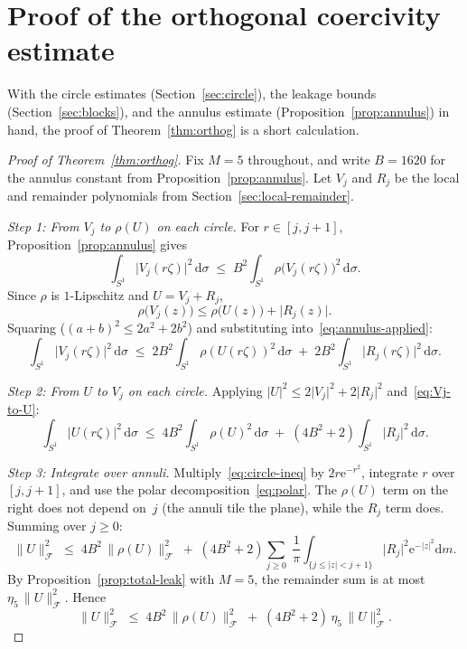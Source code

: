 \documentclass[11pt]{amsart}
\theoremstyle{definition}
\theoremstyle{remark}
\begin{document}
 \section{Proof of the orthogonal coercivity estimate}\label{sec:assembly}

With the circle estimates (Section~\ref{sec:circle}), the leakage bounds
(Section~\ref{sec:blocks}), and the annulus estimate
(Proposition~\ref{prop:annulus}) in hand, the proof of
Theorem~\ref{thm:orthog} is a short calculation.

\begin{proof}[Proof of Theorem~\ref{thm:orthog}]
Fix $M = 5$ throughout, and write $B = 1620$ for the annulus constant from
Proposition~\ref{prop:annulus}.  Let $V_j$ and $R_j$ be the local and
remainder polynomials from Section~\ref{sec:local-remainder}.

\medskip
\noindent
\emph{Step 1: From $V_j$ to $\rho(U)$ on each circle.}\;
For $r \in [j, j{+}1]$, Proposition~\ref{prop:annulus} gives
\begin{equation}\label{eq:annulus-applied}
\int_{S^1}\lvert V_j(r\zeta) \rvert^2\,\mathrm{d}\sigma
\;\le\;
B^2\int_{S^1}\rho\bigl(V_j(r\zeta)\bigr)^2\,\mathrm{d}\sigma.
\end{equation}
Since $\rho$ is $1$-Lipschitz and $U = V_j + R_j$,
\[
\rho\bigl(V_j(z)\bigr)
\le \rho\bigl(U(z)\bigr) + \lvert R_j(z) \rvert.
\]
Squaring ($(a+b)^2 \le 2a^2 + 2b^2$) and substituting
into~\eqref{eq:annulus-applied}:
\begin{equation}\label{eq:Vj-to-U}
\int_{S^1}\lvert V_j(r\zeta) \rvert^2\,\mathrm{d}\sigma
\;\le\;
2B^2\!\int_{S^1}\rho(U(r\zeta))^2\,\mathrm{d}\sigma
\;+\; 2B^2\!\int_{S^1}\lvert R_j(r\zeta) \rvert^2\,\mathrm{d}\sigma.
\end{equation}

\medskip
\noindent
\emph{Step 2: From $U$ to $V_j$ on each circle.}\;
Applying $\lvert U \rvert^2 \le 2\lvert V_j \rvert^2 + 2\lvert R_j \rvert^2$
and~\eqref{eq:Vj-to-U}:
\begin{equation}\label{eq:circle-ineq}
\int_{S^1}\lvert U(r\zeta) \rvert^2\,\mathrm{d}\sigma
\;\le\;
4B^2\!\int_{S^1}\rho(U)^2\,\mathrm{d}\sigma
\;+\; (4B^2 + 2)\!\int_{S^1}\lvert R_j \rvert^2\,\mathrm{d}\sigma.
\end{equation}

\medskip
\noindent
\emph{Step 3: Integrate over annuli.}\;
Multiply~\eqref{eq:circle-ineq} by $2r\mathrm{e}^{-r^2}$, integrate $r$ over
$[j, j{+}1]$, and use the polar decomposition~\eqref{eq:polar}.  The
$\rho(U)$ term on the right does not depend on~$j$ (the annuli tile the
plane), while the $R_j$ term does.  Summing over $j \ge 0$:
\[
\lVert U \rVert_\mathcal{F}^2
\;\le\;
4B^2\,\lVert \rho(U) \rVert_\mathcal{F}^2
\;+\;
(4B^2 + 2)\sum_{j \ge 0}\;
\frac{1}{\pi}\int_{\{j \le \lvert z \rvert < j+1\}}\!\!
\lvert R_j \rvert^2\mathrm{e}^{-\lvert z \rvert^2}\mathrm{d} m.
\]
By Proposition~\ref{prop:total-leak} with $M = 5$, the remainder sum is at
most $\eta_5\,\lVert U \rVert_\mathcal{F}^2$.  Hence
\begin{equation}\label{eq:absorb}
\lVert U \rVert_\mathcal{F}^2
\;\le\;
4B^2\,\lVert \rho(U) \rVert_\mathcal{F}^2
\;+\;
(4B^2 + 2)\,\eta_5\,\lVert U \rVert_\mathcal{F}^2.
\end{equation}


\end{proof}
\end{document}
